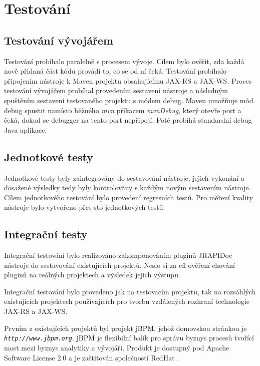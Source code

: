 \documentclass[11pt,twoside,a4paper]{book}
\begin{document}
\chapter{Testování}

\section{Testování vývojářem}

Testování probíhalo paralelně s procesem vývoje. Cílem bylo ověřit, zda každá
nově přidaná část kódu provádí to, co se od ní čeká. Testování probíhalo
připojením nástroje k Maven projektu obsahujícímu JAX-RS a JAX-WS. Proces
testování vývojářem probíhal provedením sestavení nástroje a následným spuštěním
sestavení testovaného projektu s módem debug. Maven umožňuje mód debug spustit
namísto běžného {\em mvn} příkazem {\em mvnDebug}, který otevře port a čeká,
dokud se debugger na tento port nepřipojí. Poté probíhá standardní debug Java
aplikace.

\section{Jednotkové testy}

Jednotkové testy byly zaintegrovány do sestavování nástroje, jejich vykonání a
dosažené výsledky tedy byly kontrolovány s každým novým sestavením nástroje.
Cílem jednotkového testování bylo provedení regresních testů. Pro měření kvality
nástroje bylo vytvořeno přes sto jednotkových testů.

\section{Integrační testy}

Integrační testování bylo realizováno zakomponováním pluginů JRAPIDoc nástroje
do sestavování existujících projektů. Neslo si za cíl ověření chování pluginů na
reálných projektech a výsledek jejich výstupu.

Integrační testování bylo provedeno jak na testovacím projektu, tak na
rozsáhlých existujících projektech používajících pro tvorbu vzdálených rozhraní
technologie JAX-RS a JAX-WS.

Prvním z existujících projektů byl projekt jBPM, jehož domovskou stránkou je
{\em \nolinkurl{http://www.jbpm.org}}.
jBPM je flexibilní balík pro správu byznys procesů tvořící most mezi byznys
analytiky a vývojáři. Produkt je dostupný pod Apache Software License 2.0 a je
zaštiťován společností RedHat \cite{RedHatHome}.
\end{document}
